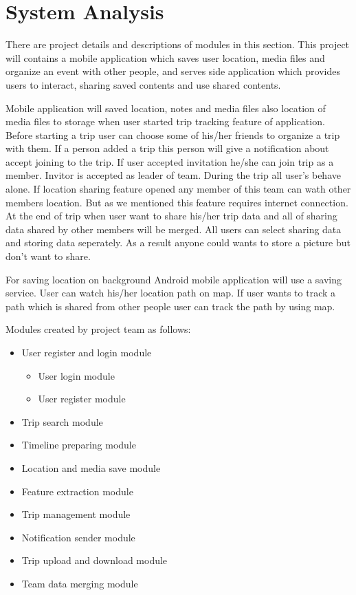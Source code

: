 \chapter{System Analysis}
There are project details and descriptions of modules in this section.
This project will contains a mobile application which saves user location, media files and organize an event with other people, and serves side application which provides users to interact, sharing saved contents and use shared contents. 

Mobile application will saved location, notes and media files also location of media files to storage when user started trip tracking feature of application. Before starting a trip user can choose some of his/her friends to organize a trip with them. If a person added a trip this person will give a notification about accept joining to the trip. If user accepted invitation he/she can join trip as a member. Invitor is accepted as leader of team. During the trip all user's behave alone. If location sharing feature opened any member of this team can wath other members location. But as we mentioned this feature requires internet connection. At the end of trip when user want to share his/her trip data and all of sharing data shared by other members will be merged. All users can select sharing data and storing data seperately. As a result anyone could wants to store a picture but don't want to share. 

For saving location on background Android mobile application will use a saving service. User can watch his/her location path on map. If user wants to track a path which is shared from other people user can track the path by using map.

Modules created by project team as follows:
\begin{itemize}
    \item User register and login module
    \begin{itemize}
        \item User login module
        \item User register module
    \end{itemize}
    \item Trip search module
    \item Timeline preparing module
    \item Location and media save module
    \item Feature extraction module
    \item Trip management module
    \item Notification sender module
    \item Trip upload and download module
    \item Team data merging module
\end{itemize}

